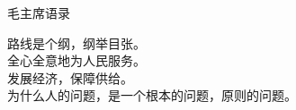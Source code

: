 \begin{center}
\huge
毛主席语录
\end{center}
\vspace{1.5\baselineskip}

\Large
路线是个纲，纲举目张。\\

全心全意地为人民服务。\\

发展经济，保障供给。\\

为什么人的问题，是一个根本的问题，原则的问题。\\
